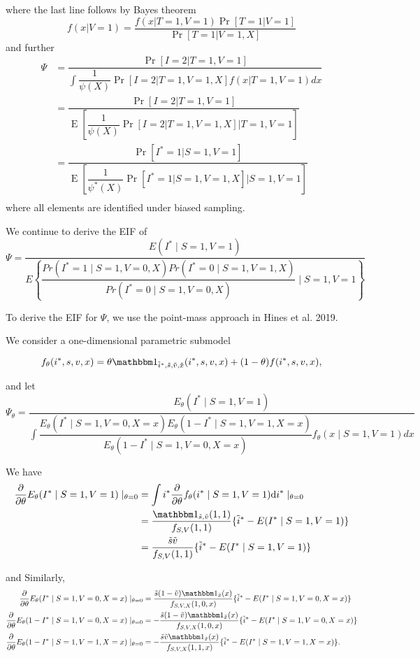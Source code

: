 \documentclass{article}
\DeclareMathOperator{\E}{E}
\begin{document}
where the last line follows by Bayes theorem 
\begin{equation*}
    f(x | V = 1) = \dfrac{f(x | T = 1, V = 1)\Pr[T = 1 | V = 1]}{\Pr[T = 1 | V = 1, X]}
\end{equation*}
and further
\begin{align*}
    \Psi &= \dfrac{\Pr[I = 2 | T = 1, V = 1]}{\int \dfrac{1}{\psi(X)} \Pr[I = 2 | T = 1, V = 1, X] f(x | T = 1, V = 1) dx} \\
    &= \dfrac{\Pr[I = 2 | T = 1, V = 1]}{\E\left[\dfrac{1}{\psi(X)} \Pr[I = 2 | T = 1, V = 1, X] \bigg| T = 1, V = 1\right]} \\
    &= \dfrac{\Pr[I^* = 1 | S = 1, V = 1]}{\E\left[\dfrac{1}{\psi^*(X)} \Pr[I^* = 1 | S = 1, V = 1, X] \bigg| S = 1, V = 1\right]} \\
\end{align*}
where all elements are identified under biased sampling.


We continue to derive the EIF of
$$\Psi = \dfrac{E(I^*\mid S=1, V=1)}{E\left\{\dfrac{Pr(I^*=1\mid S=1, V=0, X)Pr(I^*=0\mid S=1, V=1, X)}{Pr(I^*=0\mid S=1, V=0, X)}\mid S=1, V=1\right\}}$$

To derive the EIF for $\Psi$, we use the point-mass approach in Hines et al. 2019.


We consider a one-dimensional parametric submodel

$$f_\theta(i^*, s, v, x)=\theta \mathbbm 1_{\tilde i^*, \tilde s, \tilde v, \tilde x}(i^*, s, v, x) + (1-\theta)f(i^*, s, v,x),$$

and let
$$\Psi_\theta = \dfrac{E_\theta(I^*\mid S=1, V=1)}{\int \dfrac{E_\theta(I^*\mid S=1, V=0, X=x)E_\theta(1-I^*\mid S=1, V=1, X=x)}{E_\theta(1-I^*\mid S=1, V=0, X=x)}f_\theta(x\mid S=1, V=1)dx}$$


We have
\begin{align*}
    \dfrac{\partial}{\partial\theta}E_\theta(I^*\mid S=1, V=1)\mid_{\theta=0} &= \int i^* \dfrac{\partial}{\partial\theta}f_\theta(i^*\mid S=1, V=1)\mathrm d i^*\mid_{\theta = 0}\\
    &= \dfrac{\mathbbm 1_{\tilde s,\tilde v}(1, 1)}{f_{S, V}(1, 1)}\{\tilde i^* - E(I^*\mid S=1, V=1)\}\\
    &= \dfrac{\tilde s\tilde v}{f_{S, V}(1, 1)}\{\tilde i^* - E(I^*\mid S=1, V=1)\}
\end{align*}

and Similarly,
\begin{align*}
    \dfrac{\partial}{\partial\theta}E_\theta(I^*\mid S=1, V=0, X=x)\mid_{\theta=0} &= \dfrac{\tilde s(1-\tilde v)\mathbbm 1_{\tilde x}(x)}{f_{S, V, X}(1, 0, x)}\{\tilde i^* - E(I^*\mid S=1, V=0, X=x)\}\\
     \dfrac{\partial}{\partial\theta}E_\theta(1-I^*\mid S=1, V=0, X=x)\mid_{\theta=0} &= -\dfrac{\tilde s(1-\tilde v)\mathbbm 1_{\tilde x}(x)}{f_{S, V, X}(1, 0, x)}\{\tilde i^* - E(I^*\mid S=1, V=0, X=x)\}\\
     \dfrac{\partial}{\partial\theta}E_\theta(1-I^*\mid S=1, V=1, X=x)\mid_{\theta=0} &= -\dfrac{\tilde s\tilde v\mathbbm 1_{\tilde x}(x)}{f_{S, V, X}(1, 1, x)}\{\tilde i^* - E(I^*\mid S=1, V=1, X=x)\}.
\end{align*}
\end{document}
